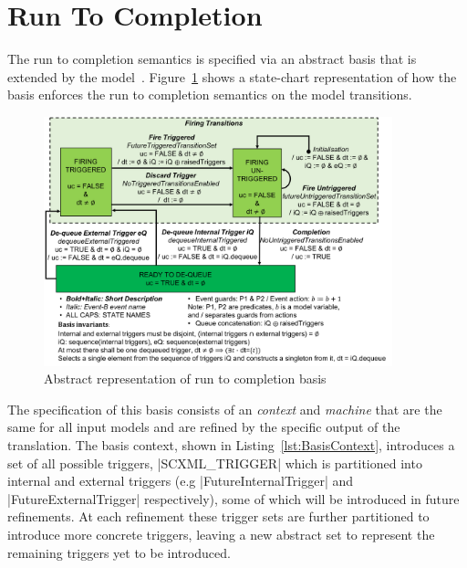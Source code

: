 

\section{Run To Completion}
\label{sec:run-completion}
The run to completion semantics is specified via an abstract basis that is extended by the model~\cite{MoSnHo18,MoSnHo-ABZ2020}. 
Figure~\ref{fig:basis} shows a state-chart representation of how the basis enforces 
the run to completion semantics on the model transitions. 

\begin{figure}[!h]
	\vspace{-.4cm}
	\centering
	\includegraphics[width=0.90\textwidth, trim=30 50 60 0]{figures/Picture6.png}
	\caption{Abstract representation of run to completion basis}
	\label{fig:basis}
	\vspace{-.4cm}
\end{figure}

The specification of this basis consists of an \EVENTB \emph{context} and \emph{machine} that are the same for all input models and are refined by the specific output of the translation.  
The basis context, shown in Listing~\ref{lst:BasisContext}, introduces a set of all possible triggers, |SCXML_TRIGGER| which is partitioned into internal and external triggers 
(e.g |FutureInternalTrigger| and |FutureExternalTrigger| respectively), 
some of which will be introduced in future refinements. 
At each refinement these trigger sets are further partitioned to introduce more concrete triggers, 
leaving a new abstract set to represent the remaining triggers yet to be introduced. 

